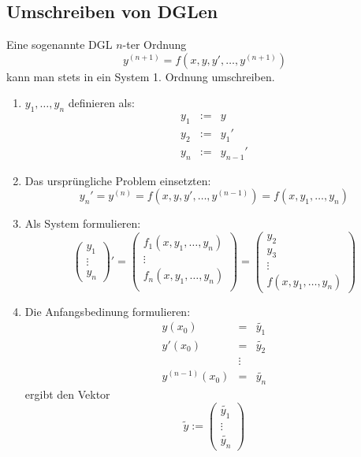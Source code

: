 \subsection{Umschreiben von DGLen}
Eine sogenannte DGL $n$-ter Ordnung
\begin{equation*}
	y^{(n+1)} = f(x, y, y', \ldots, y^{(n+1)})
\end{equation*}
kann man stets in ein System 1. Ordnung umschreiben.

\begin{enumerate}
	\item $y_1, \ldots, y_n$ definieren als:
		\begin{eqnarray*}
			y_1 &:=& y\\
			y_2 &:=& y_1'\\
			y_n &:=& y_{n-1}'
		\end{eqnarray*}
	\item Das ursprüngliche Problem einsetzten:
		\begin{equation*}
			y_n' = y^{(n)} = f(x,y, y', \ldots, y^{(n-1)}) =
			f(x, y_1, \ldots, y_n)
		\end{equation*}
	\item Als System formulieren:
		\begin{equation*}
			{\begin{pmatrix}
				y_1 \\ \vdots \\ y_n
			\end{pmatrix}}'
			=
			\begin{pmatrix}
				f_1(x, y_1, \ldots, y_n) \\
				\vdots \\
				f_n(x, y_1, \ldots, y_n) \\
			\end{pmatrix}
			=
			\begin{pmatrix}
				y_2 \\ y_3 \\ \vdots \\ f(x, y_1, \ldots, y_n)
			\end{pmatrix}
		\end{equation*}
	\item Die Anfangsbedinung formulieren:
		\begin{eqnarray*}
			y(x_0) &=& \tilde{y_1} \\
			y'(x_0) &=& \tilde{y_2} \\
			& \vdots & \\
			y^{(n-1)}(x_0) &=& \tilde{y_n}
		\end{eqnarray*}
		ergibt den Vektor
		\begin{equation*}
			\tilde{y} := 
			\begin{pmatrix}
				\tilde{y_1} \\ \vdots \\ \tilde{y_n}
			\end{pmatrix}
		\end{equation*}
\end{enumerate}

